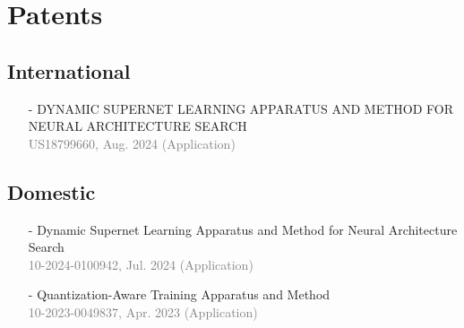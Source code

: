 \documentclass[letterpaper,11pt]{article}
\begin{document}
\section{Patents}
\subsection*{International}
\begin{itemize}
  \item[-]	\small DYNAMIC SUPERNET LEARNING APPARATUS AND METHOD FOR NEURAL ARCHITECTURE SEARCH \\
  \footnotesize  \textcolor{gray}{US18799660, Aug. 2024 (Application)}
\end{itemize}

\subsection*{Domestic}
\begin{itemize}
  \item[-]	\small Dynamic Supernet Learning Apparatus and Method for Neural Architecture Search \\
  \footnotesize  \textcolor{gray}{10-2024-0100942, Jul. 2024 (Application)}
  \item[-] \small Quantization-Aware Training Apparatus and Method \\
  \footnotesize  \textcolor{gray}{10-2023-0049837, Apr. 2023 (Application)}
\end{itemize}

\end{document}
